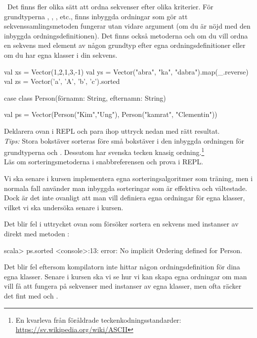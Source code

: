 \Task \what~Det finns fler olika sätt att ordna sekvenser efter olika kriterier. För  grundtyperna , , , etc., finns inbyggda ordningar som gör att sekvenssamlingsmetoden  fungerar utan vidare argument (om du är nöjd med den inbyggda ordningsdefinitionen). Det finns också metoderna  och  om du vill ordna en sekvens med element av någon grundtyp efter egna ordningsdefinitioner eller om du har egna klasser i din sekvens.
\begin{Code}
val xs = Vector(1,2,1,3,-1)
val ys = Vector("abra", "ka", "dabra").map(_.reverse)
val zs = Vector('a', 'A', 'b', 'c').sorted

case class Person(förnamn: String, efternamn: String)

val ps = Vector(Person("Kim","Ung"), Person("kamrat", "Clementin"))
\end{Code}
Deklarera ovan i REPL och para ihop uttryck nedan med rätt resultat.
\\\emph{Tips:} Stora bokstäver sorteras före små bokstäver i den inbyggda ordningen för grundtyperna  och . Dessutom har svenska tecken knasig ordning.\footnote{En kvarleva från föråldrade teckenkodningsstandarder:    \url{https://sv.wikipedia.org/wiki/ASCII}}
\\Läs om sorteringsmetoderna i snabbreferensen och prova i REPL.

\begin{ConceptConnections}

\end{ConceptConnections}
Vi ska senare i kursen implementera egna sorteringsalgoritmer som träning, men i normala fall använder man inbyggda sorteringar som är effektiva och vältestade. Dock är det inte ovanligt att man vill definiera egna ordningar för egna klasser, vilket vi ska undersöka senare i kursen.

\SOLUTION

\TaskSolved \what

\begin{ConceptConnections}

\end{ConceptConnections}
Det blir fel i uttrycket ovan som försöker sortera en sekvens med instanser av  direkt med metoden :
\begin{REPL}
scala> ps.sorted
<console>:13: error: No implicit Ordering defined for Person.
\end{REPL}
Det blir fel eftersom kompilatorn inte hittar någon ordningsdefinition för dina egna klasser. Senare i kursen ska vi se hur vi kan skapa egna ordningar om man vill få  att fungera på sekvenser med instanser av egna klasser, men ofta räcker det fint med  och .
\QUESTEND


